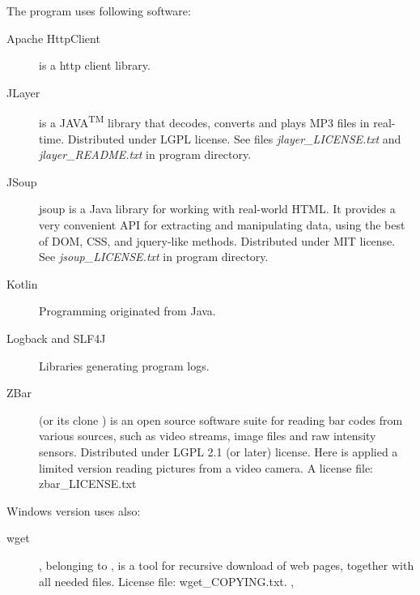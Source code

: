 \documentclass[polish,a4paper,11pt,oneside]{article}
\begin{document}
The program uses following software:

\begin{description}
\item[Apache HttpClient]
  is a http client library.

\item[JLayer]
  is a JAVA\textsuperscript{TM} library that decodes, converts and plays MP3 files in real-time.
  Distributed under LGPL license.
  See files {\em jlayer\_LICENSE.txt} and {\em jlayer\_README.txt} in program directory.

\item[JSoup]
  jsoup is a Java library for working with real-world HTML.
  It provides a very convenient API for extracting and manipulating data,
  using the best of DOM, CSS, and jquery-like methods.
  Distributed under MIT license.
  See {\em jsoup\_LICENSE.txt} in program directory.

\item[Kotlin]
  Programming
  originated from Java.

\item[Logback and SLF4J]
  Libraries generating program logs.

\item[ZBar]
  (or its clone 
  )
  is an open source software suite for reading bar codes from various sources,
  such as video streams, image files and raw intensity sensors.
  Distributed under LGPL 2.1 (or later) license.
  Here is applied a limited version reading pictures from a video camera.
  A license file: zbar\_LICENSE.txt

\end{description}

Windows version uses also:
  
\begin{description}

\item[wget]
  ,
  belonging to ,
  is a tool for recursive download of web pages, together with all needed files.
  License file: wget\_COPYING.txt.
  ,
  
\end{description}
\end{document}
